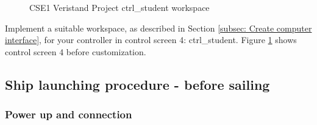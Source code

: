 \documentclass[a4paper,twoside,english]{report}
\begin{document}
\begin{enumerate}
\begin{enumerate}
\begin{figure}
\caption{\label{fig: CSE1 student_ctrl workspace}CSE1 Veristand Project ctrl\_student
workspace}
\end{figure}
Implement a suitable workspace, as described in Section \ref{subsec: Create computer interface},
for your controller in control screen 4: ctrl\_student. Figure \ref{fig: CSE1 student_ctrl workspace}
shows control screen 4 before customization.
\end{enumerate}
\end{enumerate}
\clearpage{}

\subsection{Ship launching procedure - before sailing}

\subsubsection{Power up and connection}
\end{document}
